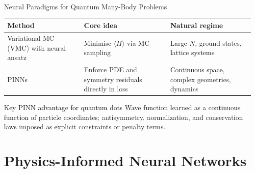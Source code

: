 \documentclass[aspectratio=169,10pt]{beamer}
\begin{document}
\begin{frame}{Neural Paradigms for Quantum Many-Body Problems}
  \renewcommand{\arraystretch}{1.35}
  \begin{tabular}{p{2.6cm}p{4.0cm}p{4.6cm}}
    \toprule
    \textbf{Method} & \textbf{Core idea} & \textbf{Natural regime} \\
    \midrule
    Variational MC (VMC) with neural ansatz &
      Minimise $\langle H\rangle$ via MC sampling &
      Large $N$, ground states, lattice systems \\
    \alert{PINNs} &
      Enforce PDE and symmetry residuals directly in loss &
      Continuous space, complex geometries, dynamics \\
    \bottomrule
  \end{tabular}

  \vspace{0.5cm}
  \begin{alertblock}{Key PINN advantage for quantum dots}
    Wave function learned as a continuous function
    of particle coordinates; antisymmetry, normalization, and conservation
    laws imposed as explicit constraints or penalty terms.
  \end{alertblock}
\end{frame}

\section{Physics-Informed Neural Networks}
\end{document}
